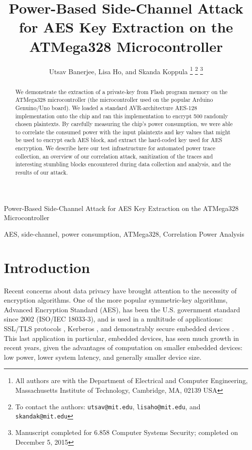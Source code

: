 \documentclass[journal]{ieee_style}
\begin{document}
\title{Power-Based Side-Channel Attack for AES Key Extraction on the ATMega328 Microcontroller}

\author{Utsav Banerjee,
        Lisa Ho,
        and Skanda Koppula%
\thanks{All authors are with the Department
of Electrical and Computer Engineering, Massachusetts Institute of Technology, Cambridge,
MA, 02139 USA}%
\thanks{To contact the authors: \texttt{utsav@mit.edu}, \texttt{lisaho@mit.edu}, and \texttt{skandak@mit.edu}}%
\thanks{Manuscript completed for 6.858 Computer Systems Security; completed on December 5, 2015}}

%
{Power-Based Side-Channel Attack for AES Key Extraction on the ATMega328 Microcontroller}
\maketitle

\begin{abstract}
    We demonstrate the extraction of a private-key from Flash program memory on the ATMega328 microcontroller (the microcontroller used on the popular Arduino Genuino/Uno board). We loaded a standard AVR-architecture AES-128 implementation onto the chip and ran this implementation to encrypt 500 randomly chosen plaintexts. By carefully measuring the chip's power consumption, we were able to correlate the consumed power with the input plaintexts and key values that might be used to encrypt each AES block, and extract the hard-coded key used for AES encryption. We describe here our test infrastructure for automated power trace collection, an overview of our correlation attack, sanitization of the traces and interesting stumbling blocks encountered during data collection and analysis, and the results of our attack.
\end{abstract}

\begin{IEEEkeywords}
AES, side-channel, power consumption, ATMega328, Correlation Power Analysis
\end{IEEEkeywords}

\section{Introduction}
Recent concerns about data privacy have brought attention to the necessity of encryption algorithms. One of the more popular symmetric-key algorithms, Advanced Encryption Standard (AES), has been the U.S. government standard since 2002 (ISO/IEC 18033-3), and is used in a multitude of applications: SSL/TLS protocols \cite{ssl}, Kerberos \cite{kerberos}, and demonstrably secure embedded devices \cite{embedded}. This last application in particular, embedded devices, has seen much growth in recent years, given the advantages of computation on smaller embedded devices: low power, lower system latency, and generally smaller device size.
\end{document}
